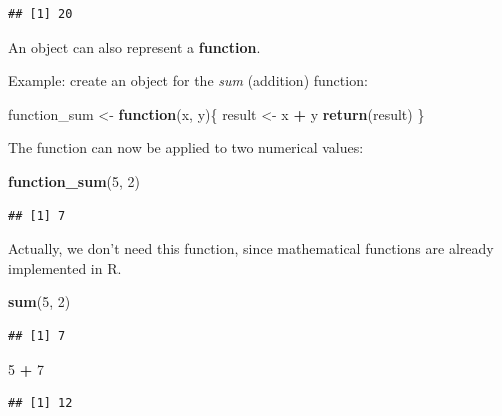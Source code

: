 \documentclass[
]{article}
\newenvironment{Shaded}{\begin{snugshade}}{\end{snugshade}}
\newcommand{\ControlFlowTok}[1]{\textcolor[rgb]{0.13,0.29,0.53}{\textbf{#1}}}
\newcommand{\DecValTok}[1]{\textcolor[rgb]{0.00,0.00,0.81}{#1}}
\newcommand{\KeywordTok}[1]{\textcolor[rgb]{0.13,0.29,0.53}{\textbf{#1}}}
\newcommand{\NormalTok}[1]{#1}
\newcommand{\OperatorTok}[1]{\textcolor[rgb]{0.81,0.36,0.00}{\textbf{#1}}}
\newcommand{\StringTok}[1]{\textcolor[rgb]{0.31,0.60,0.02}{#1}}
\begin{document}
\begin{verbatim}
## [1] 20
\end{verbatim}

An object can also represent a \textbf{function}.

Example: create an object for the \emph{sum} (addition) function:

\begin{Shaded}
\begin{Highlighting}[]
\NormalTok{function_sum <-}\StringTok{ }\ControlFlowTok{function}\NormalTok{(x, y)\{}
\NormalTok{  result <-}\StringTok{ }\NormalTok{x }\OperatorTok{+}\StringTok{ }\NormalTok{y}
  \KeywordTok{return}\NormalTok{(result)}
\NormalTok{\}}
\end{Highlighting}
\end{Shaded}

The function can now be applied to two numerical values:

\begin{Shaded}
\begin{Highlighting}[]
\KeywordTok{function_sum}\NormalTok{(}\DecValTok{5}\NormalTok{, }\DecValTok{2}\NormalTok{)}
\end{Highlighting}
\end{Shaded}

\begin{verbatim}
## [1] 7
\end{verbatim}

Actually, we don't need this function, since mathematical functions are already implemented in R.

\begin{Shaded}
\begin{Highlighting}[]
\KeywordTok{sum}\NormalTok{(}\DecValTok{5}\NormalTok{, }\DecValTok{2}\NormalTok{)}
\end{Highlighting}
\end{Shaded}

\begin{verbatim}
## [1] 7
\end{verbatim}

\begin{Shaded}
\begin{Highlighting}[]
\DecValTok{5} \OperatorTok{+}\StringTok{ }\DecValTok{7}
\end{Highlighting}
\end{Shaded}

\begin{verbatim}
## [1] 12
\end{verbatim}
\end{document}
